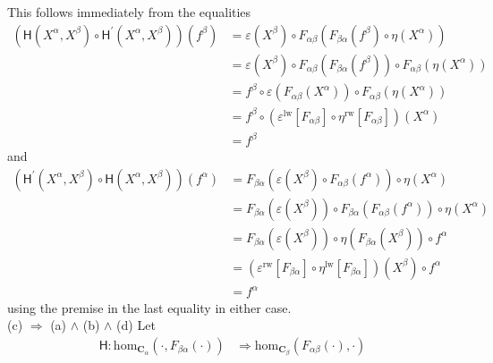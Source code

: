 \begin{prf}
This follows immediately from the equalities
\begin{align*}
  \left(
    \mathsf{H}(X^{\alpha},X^{\beta})
    \circ
    \mathsf{H}^{\prime}(X^{\alpha},X^{\beta})
  \right)
  (f^{\beta})
  &=
  \varepsilon(X^{\beta})
  \circ
  F_{\alpha\beta}
  \left(
    F_{\beta\alpha}(f^{\beta})
    \circ
    \eta(X^{\alpha})
  \right)
  \\
  &=
  \varepsilon(X^{\beta})
  \circ
  F_{\alpha\beta}
  \left(
    F_{\beta\alpha}(f^{\beta})
  \right)
  \circ
  F_{\alpha\beta}
  \left(
    \eta(X^{\alpha})
  \right)
  \\
  &=
  f^{\beta}
  \circ
  \varepsilon
  \left(
    F_{\alpha\beta}(X^{\alpha})
  \right)
  \circ
  F_{\alpha\beta}
  \left(
    \eta(X^{\alpha})
  \right)
  \tag{NT}
  \\
  &=
  f^{\beta}
  \circ
  \left(
    \varepsilon^{\textrm{lw}}[F_{\alpha\beta}]
    \circ
    \eta^{\textrm{rw}}[F_{\alpha\beta}]
  \right)
  (X^{\alpha})
  \\
  &=
  f^{\beta}
\end{align*}
and
\begin{align*}
  \left(
    \mathsf{H}^{\prime}(X^{\alpha},X^{\beta})
    \circ
    \mathsf{H}(X^{\alpha},X^{\beta})
  \right)
  (f^{\alpha})
  &=
  F_{\beta\alpha}
  \left(
    \varepsilon(X^{\beta})
    \circ
    F_{\alpha\beta}(f^{\alpha})
  \right)
  \circ
  \eta(X^{\alpha})
  \\
  &=
  F_{\beta\alpha}
  \left(
    \varepsilon(X^{\beta})
  \right)
  \circ
  F_{\beta\alpha}
  \left(
    F_{\alpha\beta}(f^{\alpha})
  \right)
  \circ
  \eta(X^{\alpha})
  \\
  &=
  F_{\beta\alpha}
  \left(
    \varepsilon(X^{\beta})
  \right)
  \circ
  \eta
  \left(
    F_{\beta\alpha}(X^{\beta})
  \right)
  \circ
  f^{\alpha}
  \tag{NT}
  \\
  &=
  \left(
    \varepsilon^{\textrm{rw}}[F_{\beta\alpha}]
    \circ
    \eta^{\textrm{lw}}[F_{\beta\alpha}]
  \right)
  (X^{\beta})
  \circ
  f^{\alpha}
  \\
  &=
  f^{\alpha}
\end{align*}
using the premise in the last equality in either case.
\\
{\glqq}(c) $\Rightarrow$ (a) $\land$ (b) $\land$ (d){\grqq}
\qquad
Let
\begin{align*}
  \mathsf{H}
  \colon
  \mathrm{hom}_{\mathbf{C}_{\alpha}}(\cdot,F_{\beta\alpha}(\cdot))
  &\Rightarrow
  \mathrm{hom}_{\mathbf{C}_{\beta}}(F_{\alpha\beta}(\cdot),\cdot)
\end{align*}

\end{prf}
